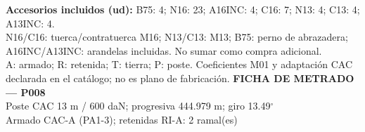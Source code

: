 \begingroup\scriptsize
\textbf{Accesorios incluidos (ud):} B75: 4; N16: 23; A16INC: 4; C16: 7; N13: 4; C13: 4; A13INC: 4.\\
N16/C16: tuerca/contratuerca M16; N13/C13: M13; B75: perno de abrazadera; A16INC/A13INC: arandelas incluidas. No sumar como compra adicional.\\
A: armado; R: retenida; T: tierra; P: poste. Coeficientes M01 y adaptación CAC declarada en el catálogo; no es plano de fabricación.
\endgroup\endgroup
\clearpage{}
\begingroup\small\setlength{\parskip}{3pt}\renewcommand{\arraystretch}{1.05}
\textbf{\large FICHA DE METRADO — P008}\\[4pt]
Poste CAC 13 m / 600 daN; progresiva 444.979 m; giro 13.49\ensuremath{^\circ}\\
Armado CAC-A (PA1-3); retenidas RI-A: 2 ramal(es)\\
\begingroup\scriptsize
